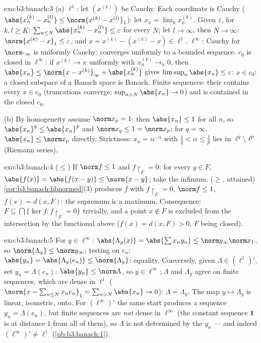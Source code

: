 \begin{solution}{exo:b3:banach:3}
(a) $\ell^1$: let $(x^{(k)})$ be Cauchy. Each coordinate is
Cauchy ($\abs{x^{(k)}_n - x^{(l)}_n} \leq \norm{x^{(k)} -
x^{(l)}}_1$): let $x_n = \lim_kx^{(k)}_n$. Given $\varepsilon$,
for $k, l \geq K$: $\sum_{n \leq N}\abs{x^{(k)}_n - x^{(l)}_n}
\leq \varepsilon$ for every $N$; let $l \to \infty$, then $N \to
\infty$: $\norm{x^{(k)} - x}_1 \leq \varepsilon$, and $x =
x^{(k)} - (x^{(k)} - x) \in \ell^1$. $\ell^\infty$: Cauchy for
$\norm\cdot_\infty$ is uniformly Cauchy: converges uniformly to
a bounded sequence. $c_0$ is closed in $\ell^\infty$: if
$x^{(k)} \to x$ uniformly with $x^{(k)}_n \to_n 0$, then
$\abs{x_n} \leq \norm{x - x^{(k)}}_\infty + \abs{x^{(k)}_n}$
gives $\limsup_n\abs{x_n} \leq \varepsilon$: $x \in c_0$; a
closed subspace of a Banach space is Banach. Finite sequences:
their  contains every $x \in c_0$ (truncations converge:
$\sup_{n>N}\abs{x_n} \to 0$) and is contained in the closed
$c_0$.

(b) By homogeneity assume $\norm x_p = 1$: then $\abs{x_n} \leq
1$ for all $n$, so $\abs{x_n}^q \leq \abs{x_n}^p$ and $\norm
x_q \leq 1 = \norm x_p$; for $q = \infty$, $\abs{x_n} \leq
\norm x_p$ directly. Strictness: $x_n = n^{-\alpha}$ with
$\frac1q < \alpha \leq \frac1p$ lies in $\ell^q \setminus
\ell^p$ (Riemann series).
\end{solution}

\begin{solution}{exo:b3:banach:4}
($\leq$) If $\norm f \leq 1$ and $f\restriction_F = 0$: for
every $y \in F$, $\abs{f(x)} = \abs{f(x - y)} \leq \norm{x -
y}$; take the infimum. ($\geq$, attained)
\cref{cor:b3:banach:hbnormed}(3) produces $f$ with
$f\restriction_F = 0$, $\norm f \leq 1$, $f(x) = d(x, F)$: the
supremum is a maximum. Consequence: $F \subseteq \bigcap\{\ker
f : f\restriction_F = 0\}$ trivially, and a point $x \notin F$
is excluded from the intersection by the functional above
($f(x) = d(x,F) > 0$, $F$ being closed).
\end{solution}

\begin{solution}{exo:b3:banach:5}
For $y \in \ell^\infty$: $\abs{\Lambda_y(x)} =
\abs{\sum x_ny_n} \leq \norm y_\infty\norm x_1$, so
$\norm{\Lambda_y} \leq \norm y_\infty$; testing on $e_n$:
$\abs{y_n} = \abs{\Lambda_y(e_n)} \leq \norm{\Lambda_y}$:
equality. Conversely, given $\Lambda \in (\ell^1)'$, set $y_n =
\Lambda(e_n)$: $\abs{y_n} \leq \norm\Lambda$, so $y \in
\ell^\infty$; $\Lambda$ and $\Lambda_y$ agree on finite
sequences, which are dense in $\ell^1$ ($\norm{x - \sum_{n\leq
N}x_ne_n}_1 = \sum_{n>N}\abs{x_n} \to 0$): $\Lambda =
\Lambda_y$. The map $y \mapsto \Lambda_y$ is linear, isometric,
onto. For $(\ell^\infty)'$ the same start produces a sequence
$y_n = \Lambda(e_n)$, but finite sequences are \emph{not} dense
in $\ell^\infty$
(the constant sequence $\mathbf 1$ is at distance $1$ from all
of them), so $\Lambda$ is not determined by the $y_n$ --- and
indeed $(\ell^\infty)' \neq \ell^1$
(\cref{pb:b3:banach:1}).
\end{solution}

